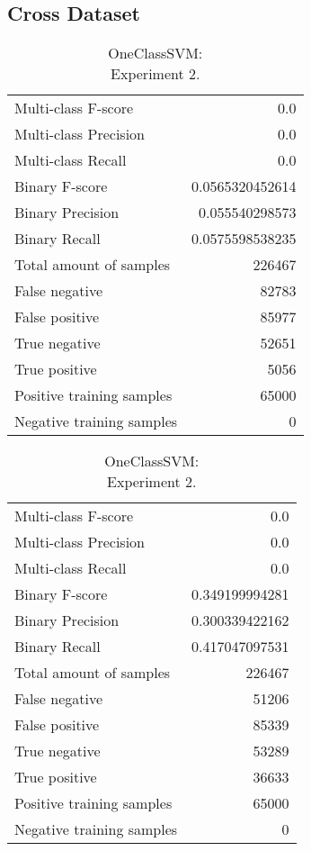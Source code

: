 \subsection{Cross Dataset}

\begin{table}[H]
\begin{minipage}{0.5\textwidth}
\caption{OneClassSVM: \\Experiment 1.}

\centering
\begin{tabular}{l r}
\toprule
Multi-class F-score & 0.0 \\
Multi-class Precision & 0.0 \\
Multi-class Recall & 0.0 \\
\midrule
Binary F-score & 0.0565320452614 \\
Binary Precision & 0.055540298573 \\
Binary Recall & 0.0575598538235 \\
\midrule
Total amount of samples & 226467 \\

False negative & 82783 \\
False positive & 85977 \\
True negative & 52651 \\
True positive & 5056 \\
\midrule
Positive training samples & 65000 \\
Negative training samples & 0 \\
\bottomrule
\end{tabular}

\end{minipage}
\hfillx
\begin{minipage}{0.5\textwidth}
\caption{OneClassSVM: \\Experiment 2.}

\centering
\begin{tabular}{l r}
\toprule
Multi-class F-score & 0.0 \\
Multi-class Precision & 0.0 \\
Multi-class Recall & 0.0 \\
\midrule
Binary F-score & 0.349199994281 \\
Binary Precision & 0.300339422162 \\
Binary Recall & 0.417047097531 \\
\midrule
Total amount of samples & 226467 \\

False negative & 51206 \\
False positive & 85339 \\
True negative & 53289 \\
True positive & 36633 \\
\midrule
Positive training samples & 65000 \\
Negative training samples & 0 \\
\bottomrule
\end{tabular}
\end{minipage}
\end{table}
